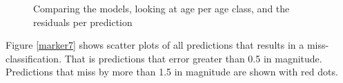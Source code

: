 \documentclass[10pt,letterpaper]{article}
\begin{document}
\begin{figure}
  \caption{\label{ref_label_overall}Comparing the models, looking at age per age class, and the residuals per prediction}
  \label{marker6}
\end{figure}

Figure \ref{marker7} shows scatter plots of all predictions that results in a miss-classification. That is predictions
that error greater than 0.5 in magnitude. Predictions that miss by more than 1.5 in magnitude are shown with red dots.
\end{document}
